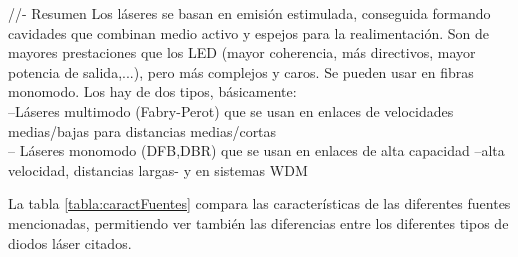 \begin{itemize}
\begin{itemize}
\begin{itemize}
 					\textcolor{rositaoscuro}{//- Resumen Los láseres se basan en emisión estimulada, conseguida formando cavidades que combinan medio activo y espejos para la realimentación. Son de mayores prestaciones que los LED (mayor coherencia, más directivos, mayor potencia de salida,...), pero más complejos y caros. Se pueden usar en fibras monomodo. Los hay de dos tipos, básicamente:\\
 					--Láseres multimodo (Fabry-Perot) que se usan en enlaces de velocidades medias/bajas para distancias medias/cortas\\
 					-- Láseres monomodo (DFB,DBR) que se usan en enlaces de alta capacidad –alta velocidad, distancias largas- y en sistemas WDM}
 			
 			
 		\end{itemize}
  		
  		La tabla \ref{tabla:caractFuentes} compara las características de las diferentes fuentes mencionadas, permitiendo ver también las diferencias entre los diferentes tipos de diodos láser citados.
  		

\end{itemize}
\end{itemize}
